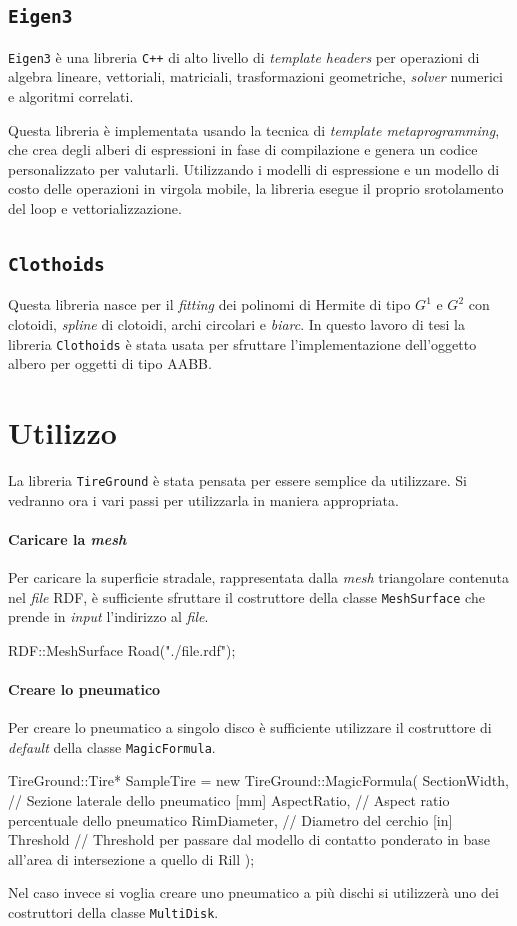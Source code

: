 \subsection{\texttt{Eigen3}}
\texttt{Eigen3} è una libreria \texttt{C++} di alto livello di \textit{template headers} per operazioni di algebra lineare, vettoriali, matriciali, trasformazioni geometriche, \textit{solver} numerici e algoritmi correlati.

Questa libreria è implementata usando la tecnica di \textit{template metaprogramming}, che crea degli alberi di espressioni in fase di compilazione e genera un codice personalizzato per valutarli. Utilizzando i modelli di espressione e un modello di costo delle operazioni in virgola mobile, la libreria esegue il proprio srotolamento del loop e vettorializzazione.
%
\subsection{\texttt{Clothoids}}
Questa libreria nasce per il \textit{fitting} dei polinomi di Hermite di tipo $G^1$ e $G^2$ con clotoidi, \textit{spline} di clotoidi, archi circolari e \textit{biarc}. In questo lavoro di tesi la libreria \texttt{Clothoids} è stata usata per sfruttare l'implementazione dell'oggetto albero per oggetti di tipo \ac{AABB}.
%
\section{Utilizzo}
La libreria \texttt{TireGround} è stata pensata per essere semplice da utilizzare. Si vedranno ora i vari passi per utilizzarla in maniera appropriata.
%
\paragraph{Caricare la \textit{mesh}}
Per caricare la superficie stradale, rappresentata dalla \textit{mesh} triangolare contenuta nel \textit{file} \ac{RDF}, è sufficiente sfruttare il costruttore della classe \texttt{MeshSurface} che prende in \textit{input} l'indirizzo al \textit{file}.
\begin{pseudoc}
	RDF::MeshSurface Road("./file.rdf");
\end{pseudoc}
%
\paragraph{Creare lo pneumatico}
Per creare lo pneumatico a singolo disco è sufficiente utilizzare il costruttore di \textit{default} della classe \texttt{MagicFormula}.
\begin{pseudoc}
	TireGround::Tire* SampleTire = new TireGround::MagicFormula(
		SectionWidth, // Sezione laterale dello pneumatico [mm]
		AspectRatio,  // Aspect ratio percentuale dello pneumatico
		RimDiameter,  // Diametro del cerchio [in]
		Threshold     // Threshold per passare dal modello di contatto ponderato in base all'area di intersezione a quello di Rill 
		);
\end{pseudoc}
Nel caso invece si voglia creare uno pneumatico a più dischi si utilizzerà uno dei costruttori della classe \texttt{MultiDisk}.

